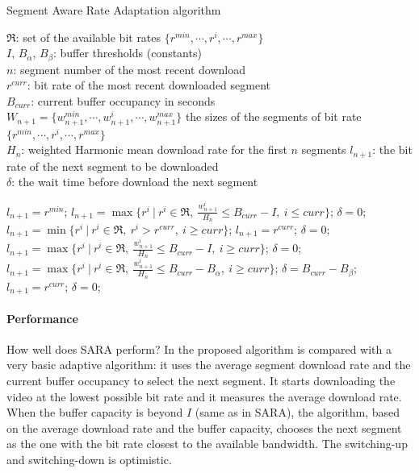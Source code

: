 \documentclass[openany]{book}
\begin{document}
\begin{algorithm}[H]
 \caption{Segment Aware Rate Adaptation algorithm}\label{alg:sara}
 \begin{algorithmic}[1]
 \renewcommand{\algorithmicrequire}{\textbf{Input:}}
 \renewcommand{\algorithmicensure}{\textbf{Output:}}
 \REQUIRE $\mathfrak{R}$: set of the available bit rates $\{r^{min}, \cdots, r^i ,\cdots, r^{max}\}$
 \\ $I$, $B_{\alpha}$, $B_{\beta}$: buffer thresholds (constants) 
 \\ $n$: segment number of the most recent download 
 \\ $r^{curr}$: bit rate of the most recent downloaded segment
 \\ $B_{curr}$: current buffer occupancy in seconds
 \\ $W_{n+1}=\{w_{n+1}^{min},\cdots, w_{n+1}^{i},\cdots, w_{n+1}^{max}\}$ the sizes of the segments of bit rate $\{r^{min}, \cdots, r^i ,\cdots, r^{max}\}$
 \\ $H_n$: weighted Harmonic mean download rate for the first $n$ segments
 \ENSURE  $l_{n+1}$: the bit rate of the next segment to be downloaded
 \\ $\delta$: the wait time before download the next segment
 
 	\STATE $l_{n+1} = r^{min}$;
 \ELSE
    	\STATE $l_{n+1} = \max\{r^i\ |\ r^i\in\mathfrak{R},\ \frac{w_{n+1}^{i}}{H_n} \leq B_{curr} - I,\ i \leq curr \}$;
        \STATE $\delta = 0$;
        	\STATE $l_{n+1} = \min\{r^i\ |\ r^i\in\mathfrak{R},\ r^i > r^{curr},\  i \geq curr \}$;
        \ELSE
        	\STATE $l_{n+1} = r^{curr}$;
        \ENDIF
    	\STATE $\delta = 0$;
    	\STATE $l_{n+1} = \max\{r^i\ |\ r^i\in\mathfrak{R},\ \frac{w_{n+1}^{i}}{H_n} \leq B_{curr} - I,\ i \geq curr \}$;
        \STATE $\delta = 0$;
      	\STATE $l_{n+1} = \max\{r^i\ |\ r^i\in\mathfrak{R},\ \frac{w_{n+1}^{i}}{H_n} \leq B_{curr} - B_{\alpha},\ i \geq curr \}$;
        \STATE $\delta = B_{curr} - B_{\beta}$;
      \ELSE
      	\STATE $l_{n+1} = r^{curr}$;
        \STATE $\delta = 0$;
    \ENDIF
 \ENDIF
 \end{algorithmic}
\end{algorithm}

\paragraph*{Performance} How well does SARA perform? In \cite{SARA} the proposed algorithm is compared with a very basic adaptive algorithm: it uses the average segment download rate and the current buffer occupancy to select the next segment. It starts downloading the video at the lowest possible bit rate and it measures the average download rate. When the buffer capacity is beyond $I$ (same as in SARA), the algorithm, based on the average download rate and the buffer capacity, chooses the next segment as the one with the bit rate closest to the available bandwidth. The switching-up and switching-down is optimistic.
\end{document}
